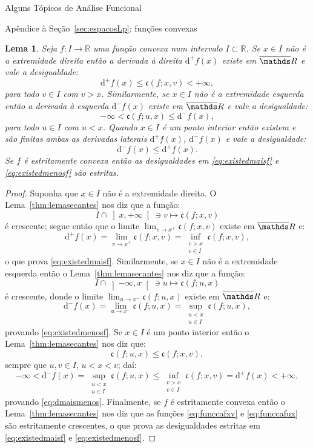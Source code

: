 \documentclass[oneside,final,11pt]{amsbook}
\newcommand{\R}{\mathds R}
\newcommand{\dd}{\mathrm d}
\newcommand{\ca}{\mathfrak c}
\theoremstyle{remark}\newtheorem{exercise}{Exercício}[chapter]
\theoremstyle{remark}\newtheorem{*exercise}[exercise]{\hbox to 0pt{\hskip 0pt minus 1fil*}Exercício}
\theoremstyle{definition}\newtheorem{exdefin}{Definição}[chapter]
\theoremstyle{plain}\newtheorem{teo}{Teorema}[section]
\theoremstyle{plain}\newtheorem{lem}[teo]{Lema}
\theoremstyle{plain}\newtheorem{prop}[teo]{Proposição}
\theoremstyle{plain}\newtheorem{cor}[teo]{Corolário}
\theoremstyle{definition}\newtheorem{defin}[teo]{Definição}
\theoremstyle{remark}\newtheorem{rem}[teo]{Observação}
\theoremstyle{definition}\newtheorem{notation}[teo]{Notação}
\theoremstyle{definition}\newtheorem{convention}[teo]{Convenção}
\theoremstyle{definition}\newtheorem{example}[teo]{Exemplo}
\numberwithin{section}{chapter}
\numberwithin{equation}{section}
\begin{document}
\begin{chapter}{Alguns Tópicos de Análise Funcional}
\begin{section}{Apêndice à Seção~\ref{sec:espacosLp}: funções convexas}
\begin{lem}\label{thm:existemderlat}
Seja $f:I\to\R$ uma função convexa num intervalo $I\subset\R$. Se $x\in I$
não é a extremidade direita então a derivada à direita $\dd^+f(x)$ existe em $\overline\R$
e vale a desigualdade:
\begin{equation}\label{eq:existedmaisf}
\dd^+f(x)\le\ca(f;x,v)<+\infty,
\end{equation}
para todo $v\in I$ com $v>x$. Similarmente, se $x\in I$ não é a extremidade esquerda
então a derivada à esquerda $\dd^-f(x)$ existe em $\overline\R$
e vale a desigualdade:
\begin{equation}\label{eq:existedmenosf}
-\infty<\ca(f;u,x)\le\dd^-f(x),
\end{equation}
para todo $u\in I$ com $u<x$. Quando $x\in I$ é um ponto interior então existem e são finitas
ambas as derivadas laterais $\dd^+f(x)$, $\dd^-f(x)$ e vale a desigualdade:
\begin{equation}\label{eq:dmaismenos}
\dd^-f(x)\le\dd^+f(x).
\end{equation}
Se $f$ é estritamente convexa então as desigualdades em \eqref{eq:existedmaisf}
e \eqref{eq:existedmenosf} são estritas.
\end{lem}
\begin{proof}
Suponha que $x\in I$ não é a extremidade direita.
O Lema~\ref{thm:lemasecantes} nos diz que a função:
\begin{equation}\label{eq:funccafxv}
I\cap\left]x,+\infty\right[\ni v\longmapsto\ca(f;x,v)
\end{equation}
é crescente; segue então que o limite $\lim_{v\to x^+}\ca(f;x,v)$ existe em $\overline\R$ e:
\[\dd^+f(x)=\lim_{v\to x^+}\ca(f;x,v)=\inf_{\substack{v>x\\v\in I}}\ca(f;x,v),\]
o que prova \eqref{eq:existedmaisf}. Similarmente, se $x\in I$ não é a extremidade
esquerda então o Lema~\ref{thm:lemasecantes} nos diz que a função:
\begin{equation}\label{eq:funccafux}
I\cap\left]-\infty,x\right[\ni u\longmapsto\ca(f;u,x)
\end{equation}
é crescente, donde o limite $\lim_{u\to x^-}\ca(f;u,x)$ existe em $\overline\R$ e:
\[\dd^-f(x)=\lim_{u\to x^-}\ca(f;u,x)=\sup_{\substack{u<x\\u\in I}}\ca(f;u,x),\]
provando \eqref{eq:existedmenosf}. Se $x\in I$ é um ponto interior então
o Lema~\ref{thm:lemasecantes} nos diz que:
\[\ca(f;u,x)\le\ca(f;x,v),\]
sempre que $u,v\in I$, $u<x<v$; daí:
\[-\infty<\dd^-f(x)=\sup_{\substack{u<x\\u\in I}}\ca(f;u,x)\le
\inf_{\substack{v>x\\v\in I}}\ca(f;x,v)=\dd^+f(x)<+\infty,\]
provando \eqref{eq:dmaismenos}.
Finalmente, se $f$ é estritamente convexa então o Lema~\ref{thm:lemasecantes} nos diz que
as funções \eqref{eq:funccafxv} e \eqref{eq:funccafux} são estritamente crescentes,
o que prova as desigualdades estritas em \eqref{eq:existedmaisf} e \eqref{eq:existedmenosf}.
\end{proof}


\end{section}
\end{chapter}
\end{document}
